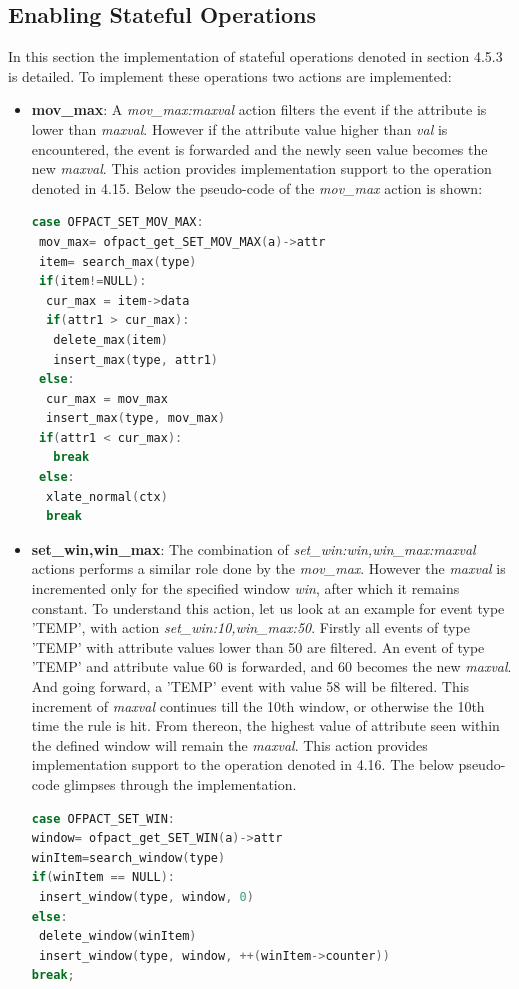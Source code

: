 \subsection{Enabling Stateful Operations}
In this section the implementation of stateful operations denoted in section 4.5.3 is detailed. To implement these operations two actions are implemented:
\begin{itemize}
 \item \textbf{mov_max}: A \textit{mov_max:maxval} action filters the event if the attribute is lower than \textit{maxval}. However if the attribute value higher than \textit{val} is encountered, the event is forwarded and the newly seen value becomes the new \textit{maxval}. This action provides implementation support to the operation denoted in 4.15. Below the pseudo-code of the \textit{mov_max} action is shown:\newline
 \begin{lstlisting}[language=c]
 case OFPACT_SET_MOV_MAX: 
 mov_max= ofpact_get_SET_MOV_MAX(a)->attr
 item= search_max(type)
 if(item!=NULL):                         
  cur_max = item->data
  if(attr1 > cur_max):
   delete_max(item)
   insert_max(type, attr1)                
 else:
  cur_max = mov_max
  insert_max(type, mov_max)
 if(attr1 < cur_max):
   break
 else:  
  xlate_normal(ctx)  
  break  
 \end{lstlisting}
 
 \item \textbf{set_win,win_max}: The combination of \textit{set_win:win,win_max:maxval} actions performs a similar role done by the \textit{mov_max}. However the \textit{maxval} is incremented only for the specified window \textit{win}, after which it remains constant. To understand this action, let us look at an example for event type 'TEMP', with action \textit{set_win:10,win_max:50}. Firstly all events of type 'TEMP' with attribute values lower than 50 are filtered. An event of type 'TEMP' and attribute value 60 is forwarded, and 60 becomes the new \textit{maxval}. And going forward, a 'TEMP' event with value 58 will be filtered. This increment of \textit{maxval} continues till the 10th window, or otherwise the 10th time the rule is hit. From thereon, the highest value of attribute seen within the defined window will remain the \textit{maxval}. This action provides implementation support to the operation denoted in 4.16. The below pseudo-code glimpses through the implementation.
 
\begin{lstlisting}[language=c]
case OFPACT_SET_WIN:
window= ofpact_get_SET_WIN(a)->attr
winItem=search_window(type)
if(winItem == NULL):
 insert_window(type, window, 0)                       
else:
 delete_window(winItem)
 insert_window(type, window, ++(winItem->counter))       
break;


\end{lstlisting}
\end{itemize}

